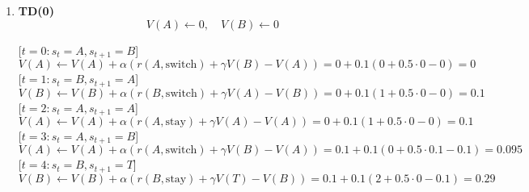 \begin{Solution}
\begin{enumerate} [label=\alph*)]
        Episode $[A, B, A, B, T]$
        
        $$
        \begin{aligned}
        G_{21} & = r(A,\text{switch}) + \gamma r(B,\text{switch}) + \gamma^2 r(A,\text{switch}) + \gamma^3 r(B,\text{stay}) \\
        & = 0 + 0.5 \cdot 1 + 0.5^2 \cdot 0 + 0.5^3 \cdot 2 \\
        & = 0.75 \\
        G_{22} & = r(A,\text{switch}) + \gamma r(B,\text{stay}) \\
        & = 0 + 0.5 \cdot 2 \\
        & = 1
        \end{aligned}
        $$

        Episode $[A, B, T]$
        
        $$
        \begin{aligned}
        G_{31} & = r(A,\text{switch}) + \gamma r(B,\text{stay}) \\
        & = 0 + 0.5 \cdot 2 \\
        & = 1
        \end{aligned}
        $$
        
        Thus
        $$
        V^\pi(A) = \dfrac{1}{5} (G_{11} + G_{12} + G_{21} + G_{22} + G_{31}) = \dfrac{21}{20}
        $$
        \vspace{1em}
        
        \item
        \textbf{TD(0)}
        $$
        V(A) \leftarrow 0, \quad V(B) \leftarrow 0
        $$
        
        [$t = 0: s_t = A, s_{t+1} = B$]
        $$
        V(A) \leftarrow V(A) + \alpha (r(A,\text{switch}) + \gamma V(B) - V(A)) = 0 + 0.1(0 + 0.5 \cdot 0 - 0) = 0
        $$
        [$t = 1: s_t = B, s_{t+1} = A$]
        $$
        V(B) \leftarrow V(B) + \alpha (r(B,\text{switch}) + \gamma V(A) - V(B)) = 0 + 0.1(1 + 0.5 \cdot 0 - 0) = 0.1
        $$
        [$t = 2: s_t = A, s_{t+1} = A$]
        $$
        V(A) \leftarrow V(A) + \alpha (r(A,\text{stay}) + \gamma V(A) - V(A)) = 0 + 0.1(1 + 0.5 \cdot 0 - 0) = 0.1
        $$
        [$t = 3: s_t = A, s_{t+1} = B$]
        $$
        V(A) \leftarrow V(A) + \alpha (r(A,\text{switch}) + \gamma V(B) - V(A)) = 0.1 + 0.1(0 + 0.5 \cdot 0.1 - 0.1) = 0.095
        $$
        [$t = 4: s_t = B, s_{t+1} = T$]
        $$
        V(B) \leftarrow V(B) + \alpha (r(B,\text{stay}) + \gamma V(T) - V(B)) = 0.1 + 0.1(2 + 0.5 \cdot 0 - 0.1) = 0.29
        $$
        

\end{enumerate}
\end{Solution}
